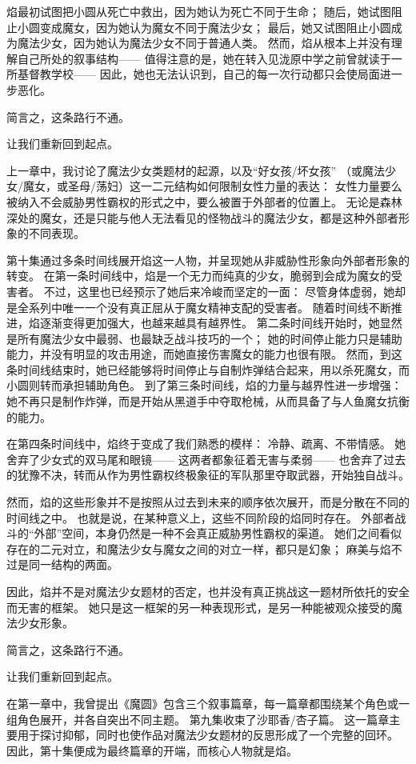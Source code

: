 焰最初试图把小圆从死亡中救出，因为她认为死亡不同于生命；
随后，她试图阻止小圆变成魔女，因为她认为魔女不同于魔法少女；
最后，她又试图阻止小圆成为魔法少女，因为她认为魔法少女不同于普通人类。
然而，焰从根本上并没有理解自己所处的叙事结构—— 值得注意的是，她在转入见泷原中学之前曾就读于一所基督教学校—— 因此，她也无法认识到，自己的每一次行动都只会使局面进一步恶化。

简言之，这条路行不通。

让我们重新回到起点。

上一章中，我讨论了魔法少女类题材的起源，以及“好女孩/坏女孩” （或魔法少女/魔女，或圣母/荡妇）这一二元结构如何限制女性力量的表达：
女性力量要么被纳入不会威胁男性霸权的形式之中，要么被置于外部者的位置上。
无论是森林深处的魔女，还是只能与他人无法看见的怪物战斗的魔法少女，都是这种外部者形象的不同表现。

第十集通过多条时间线展开焰这一人物，并呈现她从非威胁性形象向外部者形象的转变。
在第一条时间线中，焰是一个无力而纯真的少女，脆弱到会成为魔女的受害者。
不过，这里也已经预示了她后来冷峻而坚定的一面：
尽管身体虚弱，她却是全系列中唯一一个没有真正屈从于魔女精神支配的受害者。
随着时间线不断推进，焰逐渐变得更加强大，也越来越具有越界性。
第二条时间线开始时，她显然是所有魔法少女中最弱、也最缺乏战斗技巧的一个；
她的时间停止能力只是辅助能力，并没有明显的攻击用途，而她直接伤害魔女的能力也很有限。
然而，到这条时间线结束时，她已经能够将时间停止与自制炸弹结合起来，用以杀死魔女，而小圆则转而承担辅助角色。
到了第三条时间线，焰的力量与越界性进一步增强：
她不再只是制作炸弹，而是开始从黑道手中夺取枪械，从而具备了与人鱼魔女抗衡的能力。

在第四条时间线中，焰终于变成了我们熟悉的模样：
冷静、疏离、不带情感。
她舍弃了少女式的双马尾和眼镜—— 这两者都象征着无害与柔弱—— 也舍弃了过去的犹豫不决，转而从作为男性霸权终极象征的军队那里夺取武器，开始独自战斗。

然而，焰的这些形象并不是按照从过去到未来的顺序依次展开，而是分散在不同的时间线之中。
也就是说，在某种意义上，这些不同阶段的焰同时存在。
外部者战斗的“外部”空间，本身仍然是一种不会真正威胁男性霸权的渠道。
她们之间看似存在的二元对立，和魔法少女与魔女之间的对立一样，都只是幻象；
麻美与焰不过是同一结构的两面。

因此，焰并不是对魔法少女题材的否定，也并没有真正挑战这一题材所依托的安全而无害的框架。
她只是这一框架的另一种表现形式，是另一种能被观众接受的魔法少女形象。

简言之，这条路行不通。

让我们重新回到起点。

在第一章中，我曾提出《魔圆》包含三个叙事篇章，每一篇章都围绕某个角色或一组角色展开，并各自突出不同主题。
第九集收束了沙耶香/杏子篇。
这一篇章主要用于探讨抑郁，同时也使作品对魔法少女题材的反思形成了一个完整的回环。
因此，第十集便成为最终篇章的开端，而核心人物就是焰。

